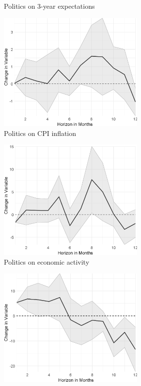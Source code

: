 \begin{figure}
\begin{subfigure}{00.24\textwidth}
		\caption{Politics on 3-year expectations}
	\end{subfigure}
	\begin{subfigure}{00.24\textwidth}
		\includegraphics[width=0.8\textwidth]{output/lp/baseline/bHP/politics/politicsoninflation_djn.eps}
		\caption{Politics on CPI inflation}
	\end{subfigure}
	\begin{subfigure}{00.24\textwidth}
		\includegraphics[width=0.8\textwidth]{output/lp/baseline/bHP/politics/politicsoneconac_djn.eps}
		\caption{Politics on economic activity}
	\end{subfigure}
	\begin{subfigure}{00.24\textwidth}
		\includegraphics[width=0.8\textwidth]{output/lp/baseline/bHP/war/waronexpectations1y_djn.eps}

\end{subfigure}
\end{figure}
